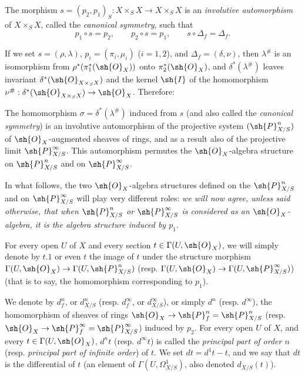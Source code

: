 \begin{env}[16.3.3]
\label{IV.16.3.3}
The morphism $s = (p_2, p_1)_S: X \times_S X \to X \times_S X$ is an \emph{involutive automorphism} of $X \times_S X$, called the \emph{canonical symmetry}, such that
\[
  \label{IV.16.3.3.1}
  p_1 \circ s = p_2, \qquad p_2 \circ s = p_1, \qquad s \circ \Delta_f = \Delta_f.
  \tag{16.3.3.1}
\]

If we set $s=(\rho,\lambda)$, $p_i=(\pi_i,\mu_i)$ ($i=1,2$), and $\Delta_f=(\delta,\nu)$, then $\lambda^\#$ is an isomorphism from $\rho^*(\pi_1^*(\sh{O}_X))$ onto $\pi_2^*(\sh{O}_X)$, and $\delta^*(\lambda^\#)$ leaves invariant $\delta^*(\sh{O}_{X\times_S X})$ and the kernel $\sh{I}$ of the homomorphism $\nu^\#: \delta^*(\sh{O}_{X\times_S X})\to\sh{O}_X$.
Therefore:
\end{env}

\begin{proposition}[16.3.4]
\label{IV.16.3.4}
The homomorphism $\sigma = \delta^*(\lambda^\#)$ induced from $s$ (and also called the \emph{canonical symmetry}) is an involutive automorphism of the projective system $(\sh{P}_{X/S}^n)$ of $\sh{O}_X$-augmented 
sheaves of rings, and as a result also of the projective limit $\sh{P}_{X/S}^\infty$.
This automorphism permutes the $\sh{O}_X$-algebra structure on $\sh{P}_{X/S}^n$ and on $\sh{P}_{X/S}^\infty$.
\end{proposition}

\begin{env}[16.3.5]
\label{IV.16.3.5}
In what follows, the two $\sh{O}_X$-algebra structures defined on the $\sh{P}_{X/S}^n$ and on $\sh{P}_{X/S}^\infty$ will play very different roles:
\emph{we will now agree, unless said otherwise, that when $\sh{P}_{X/S}^n$ or $\sh{P}_{X/S}^\infty$ is considered as an $\sh{O}_X$-algebra, it is the algebra structure induced by $p_1$}.
\end{env}

For every open $U$ of $X$ and every section $t \in \Gamma(U, \sh{O}_X)$, we will simply denote by $t.1$ or even $t$ the image of $t$ under the structure morphism $\Gamma(U, \sh{O}_X) \to \Gamma(U, \sh{P}_{X/S}^n)$ (resp. $\Gamma(U, \sh{O}_X) \to \Gamma(U, \sh{P}_{X/S}^\infty)$) (that is to say, the homomorphism corresponding to $p_1$).

\begin{definition}[16.3.6]
\label{IV.16.3.6}
We denote by $d_f^n$, or $d_{X/S}^n$ (resp. $d_f^\infty$, or $d_{X/S}^\infty$), or simply $d^n$ (resp. $d^\infty$), the homomorphism of sheaves of rings $\sh{O}_X \to \sh{P}_{f}^n = \sh{P}_{X/S}^n$ (resp. $\sh{O}_X \to \sh{P}_{f}^\infty = \sh{P}_{X/S}^\infty$) induced by $p_2$.
For every open $U$ of $X$, and every $t \in \Gamma(U, \sh{O}_X)$, $d^n t$ (resp. $d^\infty t$) is called the \emph{principal part of order $n$} (resp. \emph{principal part of infinite order}) of $t$.
We set $dt = d^1 t - t$, and we say that $dt$ is the differential of $t$ (an element of $\Gamma(U, \Omega_{X/S}^1)$, also denoted $d_{X/S}(t)$).
\end{definition}  

